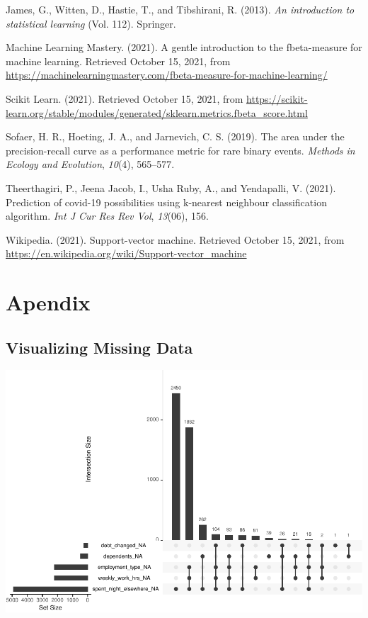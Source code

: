 \documentclass[
  10pt,
]{article}
\begin{document}
\leavevmode\hypertarget{ref-james2013introduction}{}%
James, G., Witten, D., Hastie, T., and Tibshirani, R. (2013). \emph{An introduction to statistical learning} (Vol. 112). Springer.

\leavevmode\hypertarget{ref-MLM}{}%
Machine Learning Mastery. (2021). A gentle introduction to the fbeta-measure for machine learning. Retrieved October 15, 2021, from \url{https://machinelearningmastery.com/fbeta-measure-for-machine-learning/}

\leavevmode\hypertarget{ref-scikit_learn}{}%
Scikit Learn. (2021). Retrieved October 15, 2021, from \url{https://scikit-learn.org/stable/modules/generated/sklearn.metrics.fbeta_score.html}

\leavevmode\hypertarget{ref-sofaer2019area}{}%
Sofaer, H. R., Hoeting, J. A., and Jarnevich, C. S. (2019). The area under the precision-recall curve as a performance metric for rare binary events. \emph{Methods in Ecology and Evolution}, \emph{10}(4), 565--577.

\leavevmode\hypertarget{ref-theerthagiri2021prediction}{}%
Theerthagiri, P., Jeena Jacob, I., Usha Ruby, A., and Yendapalli, V. (2021). Prediction of covid-19 possibilities using k-nearest neighbour classification algorithm. \emph{Int J Cur Res Rev\textbar{} Vol}, \emph{13}(06), 156.

\leavevmode\hypertarget{ref-wikipedia}{}%
Wikipedia. (2021). Support-vector machine. Retrieved October 15, 2021, from \url{https://en.wikipedia.org/wiki/Support-vector_machine}

\hypertarget{apendix}{%
\section*{Apendix}\label{apendix}}

\hypertarget{visualizing-missing-data}{%
\subsection{Visualizing Missing Data}\label{visualizing-missing-data}}

\begin{center}\includegraphics{phase2_report_files/figure-latex/unnamed-chunk-33-1} \end{center}
\end{document}
